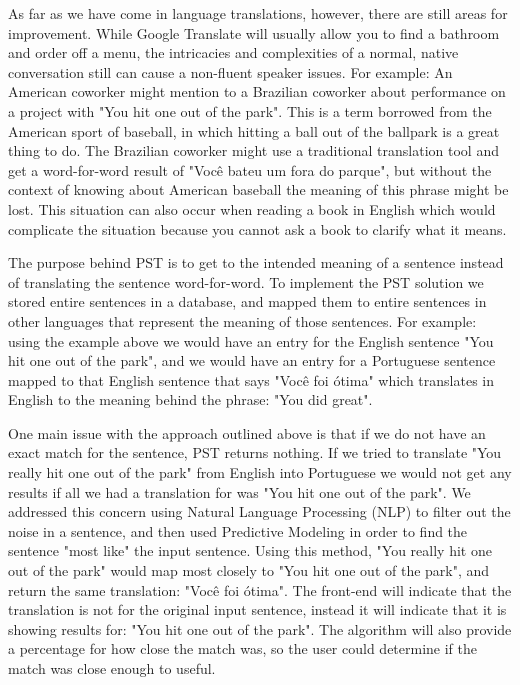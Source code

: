 \documentclass[runningheads]{llncs}
\begin{document}
	As far as we have come in language translations, however, there are still areas for improvement. While Google Translate will usually allow you to find a bathroom and order off a menu, the intricacies and complexities of a normal, native conversation still can cause a non-fluent speaker issues. For example: An American coworker might mention to a Brazilian coworker about performance on a project with "You hit one out of the park". This is a term borrowed from the American sport of baseball, in which hitting a ball out of the ballpark is a great thing to do. The Brazilian coworker might use a traditional translation tool and get a word-for-word result of "Você bateu um fora do parque", but without the context of knowing about American baseball the meaning of this phrase might be lost. This situation can also occur when reading a book in English which would complicate the situation because you cannot ask a book to clarify what it means.
	
	The purpose behind PST is to get to the intended meaning of a sentence instead of translating the sentence word-for-word. To implement the PST solution we stored entire sentences in a database, and mapped them to entire sentences in other languages that represent the meaning of those sentences. For example: using the example above we would have an entry for the English sentence "You hit one out of the park", and we would have an entry for a Portuguese sentence mapped to that English sentence that says "Você foi ótima" which translates in English to the meaning behind the phrase: "You did great". 

	One main issue with the approach outlined above is that if we do not have an exact match for the sentence, PST returns nothing. If we tried to translate "You really hit one out of the park" from English into Portuguese we would not get any results if all we had a translation for was "You hit one out of the park". We  addressed this concern using Natural Language Processing (NLP) to filter out the noise in a sentence, and then used Predictive Modeling in order to find the sentence "most like" the input sentence. Using this method, "You really hit one out of the park" would map most closely to "You hit one out of the park", and return the same translation: "Você foi ótima". The front-end will indicate that the translation is not for the original input sentence, instead it will indicate that it is showing results for: "You hit one out of the park". The algorithm will also provide a percentage for how close the match was, so the user could determine if the match was close enough to useful.
	
\end{document}
